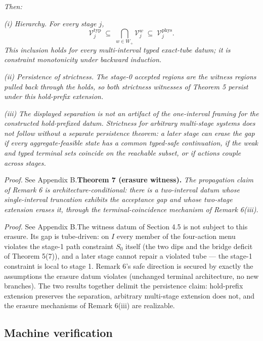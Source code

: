 \documentclass[review,11pt]{elsarticle}
\begin{document}
\emph{Then:}

\emph{(i) Hierarchy.} \emph{For every stage \(j\),}
\[\mathcal{V}^{\mathrm{typ}}_j \;\subseteq\; \bigcap_{w \in W_+} \mathcal{V}^{w}_j \;\subseteq\; \mathcal{V}^{\mathrm{phys}}_j.\]
\emph{This inclusion holds for every multi-interval typed exact-tube
datum; it is constraint monotonicity under backward induction.}

\emph{(ii) Persistence of strictness.} \emph{The stage-0 accepted
regions are the witness regions pulled back through the holds, so both
strictness witnesses of Theorem 5 persist under this hold-prefix
extension.}

\emph{(iii)} \emph{The displayed separation is not an artifact of the
one-interval framing for the constructed hold-prefixed datum. Strictness
for arbitrary multi-stage systems does not follow without a separate
persistence theorem: a later stage can erase the gap if every
aggregate-feasible state has a common typed-safe continuation, if the
weak and typed terminal sets coincide on the reachable subset, or if
actions couple across stages.}

\emph{Proof.} See Appendix B.\textbf{Theorem 7 (erasure witness).} \emph{The propagation claim of
Remark 6 is architecture-conditional: there is a two-interval datum
whose single-interval truncation exhibits the acceptance gap and whose
two-stage extension erases it, through the terminal-coincidence
mechanism of Remark 6(iii).}

\emph{Proof.} See Appendix B.The witness datum of Section 4.5 is not subject to this erasure. Its gap is
tube-driven: on \(I\) every member of the four-action menu violates the
stage-1 path constraint \(S_0\) itself (the two dips and the bridge
deficit of Theorem 5(7)), and a later stage cannot repair a violated
tube --- the stage-1 constraint is local to stage 1. Remark 6's safe
direction is secured by exactly the assumptions the erasure datum
violates (unchanged terminal architecture, no new branches). The two
results together delimit the persistence claim: hold-prefix extension
preserves the separation, arbitrary multi-stage extension does not, and
the erasure mechanisms of Remark 6(iii) are realizable.

\subsection{Machine verification}\label{machine-verification}
\end{document}
